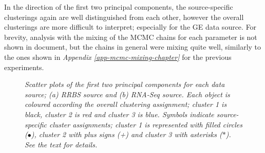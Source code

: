 In the direction of the first two principal components, the source-specific clusterings again are well distinguished from each other, however the overall clusterings are more difficult to interpret; especially for the GE data source. For brevity, analysis with the mixing of the MCMC chains for each parameter is not shown in document, but the chains in general were mixing quite well, similarly to the ones shown in \emph{Appendix \ref{app-mcmc-mixing-chapter}} for the previous experiments.
\begin{figure}[ht!]
     \begin{center}
    \end{center}
    \caption{\emph{Scatter plots of the first two principal components for each data source; (a) RRBS source and (b) RNA-Seq source. Each object is coloured according the overall clustering assignment; cluster 1 is black, cluster 2 is red and cluster 3 is blue. Symbols indicate source-specific cluster assignments; cluster 1 is represented with filled circles ($\bullet$), cluster 2 with plus signs (+) and cluster 3 with asterisks ($\ast$). See the text for details.}}
   \label{bccMV-pic}
\end{figure}
